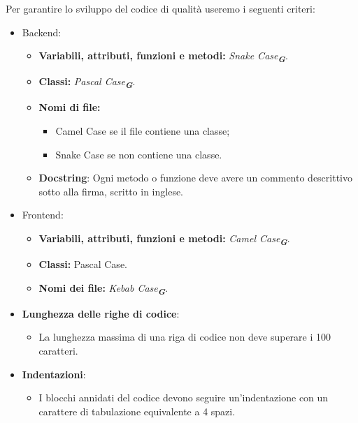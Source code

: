 Per garantire lo sviluppo del codice di qualità useremo i seguenti criteri:

\begin{itemize}
    \item Backend:
    \begin{itemize}
        \item \textbf{Variabili, attributi, funzioni e metodi:} \emph{Snake Case}\textsubscript{\textit{\textbf{G}}}.
        \item \textbf{Classi:} \emph{Pascal Case}\textsubscript{\textit{\textbf{G}}}.
        \item \textbf{Nomi di file:}
        \begin{itemize}
            \item Camel Case se il file contiene una classe;
            \item Snake Case se non contiene una classe.
        \end{itemize}
        \item \textbf{Docstring}: Ogni metodo o funzione deve avere un commento descrittivo sotto alla firma, scritto in inglese.
    \end{itemize}
    
    \item Frontend:
    \begin{itemize}
        \item \textbf{Variabili, attributi, funzioni e metodi:} \emph{Camel Case}\textsubscript{\textit{\textbf{G}}}.
        \item \textbf{Classi:} Pascal Case.
        \item \textbf{Nomi dei file:} \emph{Kebab Case}\textsubscript{\textit{\textbf{G}}}.
    \end{itemize}
    
    \item \textbf{Lunghezza delle righe di codice}:
    \begin{itemize}
        \item La lunghezza massima di una riga di codice non deve superare i 100 caratteri.
    \end{itemize}
    
    \item \textbf{Indentazioni}:
    \begin{itemize}
        \item I blocchi annidati del codice devono seguire un'indentazione con un carattere di tabulazione equivalente a 4 spazi.
    \end{itemize}
\end{itemize}

